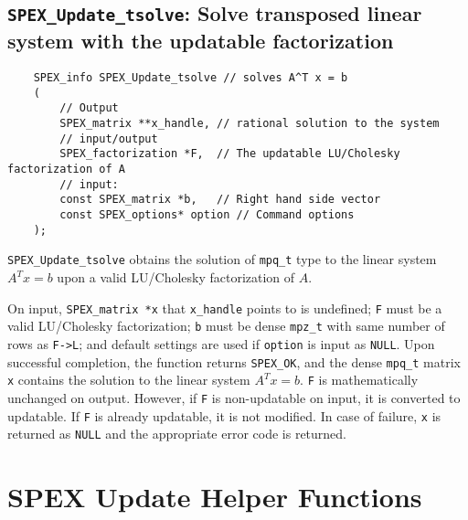 \documentclass[12pt,oneside]{book}
\theoremstyle{definition}
\begin{document}
{\subsection{\texttt{SPEX\_Update\_tsolve}: Solve transposed linear system with the updatable factorization} \label{ss:SPEX_Update_tsolve}
\begin{mdframed}[userdefinedwidth=\textwidth]
{\footnotesize
\begin{verbatim}
    SPEX_info SPEX_Update_tsolve // solves A^T x = b
    (
        // Output
        SPEX_matrix **x_handle, // rational solution to the system
        // input/output
        SPEX_factorization *F,  // The updatable LU/Cholesky factorization of A
        // input:
        const SPEX_matrix *b,   // Right hand side vector
        const SPEX_options* option // Command options
    );
\end{verbatim}
} \end{mdframed}


\verb|SPEX_Update_tsolve| obtains the solution of \verb|mpq_t| type to the
linear system $A^Tx=b$ upon a valid LU/Cholesky factorization of $A$.

On input, \verb|SPEX_matrix *x| that \verb|x_handle| points to is undefined; \verb|F| must be a valid LU/Cholesky factorization; \verb|b| must be dense \verb|mpz_t| with same number of rows as \verb|F->L|; and default settings are used if
\verb|option| is input as \verb|NULL|. Upon successful completion, the function returns \verb|SPEX_OK|, and the dense \verb|mpq_t| matrix \verb|x|
contains the solution   to the linear
system $A^Tx=b$. \verb|F| is mathematically unchanged on output. However, if \verb|F| is non-updatable on input, it is converted to updatable. If \verb|F| is already updatable, it is not modified.
In case of failure, \verb|x| is returned as \verb|NULL| and the appropriate error code is returned.


\section {SPEX Update Helper Functions}

}
\end{document}
